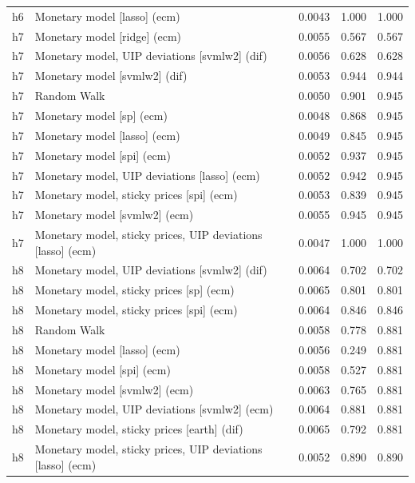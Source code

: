 \begin{ThreePartTable}
\begin{longtable}[t]{cp{5.5cm}ccc}
h6 & \raggedright Monetary model [lasso] (ecm) & 0.0043 & 1.000 & 1.000\\
\addlinespace
h7 & \raggedright Monetary model [ridge] (ecm) & 0.0055 & 0.567 & 0.567\\
h7 & \raggedright Monetary model, UIP deviations [svmlw2] (dif) & 0.0056 & 0.628 & 0.628\\
h7 & \raggedright Monetary model [svmlw2] (dif) & 0.0053 & 0.944 & 0.944\\
h7 & \raggedright Random Walk & 0.0050 & 0.901 & 0.945\\
h7 & \raggedright Monetary model [sp] (ecm) & 0.0048 & 0.868 & 0.945\\
h7 & \raggedright Monetary model [lasso] (ecm) & 0.0049 & 0.845 & 0.945\\
h7 & \raggedright Monetary model [spi] (ecm) & 0.0052 & 0.937 & 0.945\\
h7 & \raggedright Monetary model, UIP deviations [lasso] (ecm) & 0.0052 & 0.942 & 0.945\\
h7 & \raggedright Monetary model, sticky prices [spi] (ecm) & 0.0053 & 0.839 & 0.945\\
h7 & \raggedright Monetary model [svmlw2] (ecm) & 0.0055 & 0.945 & 0.945\\
h7 & \raggedright Monetary model, sticky prices, UIP deviations [lasso] (ecm) & 0.0047 & 1.000 & 1.000\\
\addlinespace
h8 & \raggedright Monetary model, UIP deviations [svmlw2] (dif) & 0.0064 & 0.702 & 0.702\\
h8 & \raggedright Monetary model, sticky prices [sp] (ecm) & 0.0065 & 0.801 & 0.801\\
h8 & \raggedright Monetary model, sticky prices [spi] (ecm) & 0.0064 & 0.846 & 0.846\\
h8 & \raggedright Random Walk & 0.0058 & 0.778 & 0.881\\
h8 & \raggedright Monetary model [lasso] (ecm) & 0.0056 & 0.249 & 0.881\\
h8 & \raggedright Monetary model [spi] (ecm) & 0.0058 & 0.527 & 0.881\\
h8 & \raggedright Monetary model [svmlw2] (ecm) & 0.0063 & 0.765 & 0.881\\
h8 & \raggedright Monetary model, UIP deviations [svmlw2] (ecm) & 0.0064 & 0.881 & 0.881\\
h8 & \raggedright Monetary model, sticky prices [earth] (dif) & 0.0065 & 0.792 & 0.881\\
h8 & \raggedright Monetary model, sticky prices, UIP deviations [lasso] (ecm) & 0.0052 & 0.890 & 0.890\\

\end{longtable}
\end{ThreePartTable}
